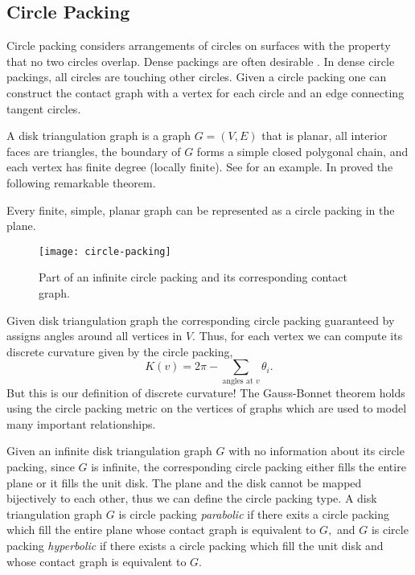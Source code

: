 \subsection{Circle Packing}
\label{sec:circle-packing}


Circle packing considers arrangements of circles on surfaces
with the property that no two circles overlap. 
Dense packings are often desirable \cite{chang_simple_2010}.
In dense circle packings, all circles are touching other circles.
Given a circle packing one can construct the contact graph with a vertex for each
circle and an edge connecting tangent circles.

A disk triangulation graph is a graph $G=(V,E)$ that is planar, all interior faces
are triangles, the boundary of $G$ forms a simple closed polygonal chain, and each
vertex has finite degree (locally finite).  See  for an example.
In  proved the following remarkable theorem.

\begin{theorem}\label{thm:kat}
Every finite, simple, planar graph can be represented as a circle packing in the plane.
\end{theorem}

\begin{figure}[htb]
        \centering
        \texttt{[image: circle-packing]}
		\caption{Part of an infinite circle packing and its corresponding contact graph.
		\label{fig:circle-packing}}
\end{figure}


Given disk triangulation graph the corresponding circle packing guaranteed
by  assigns angles around all vertices in $V$.
Thus, for each vertex we can compute its discrete curvature given by
the circle packing,
$$K(v)=2\pi -\sum_{\text{angles at } v}\theta_i.$$
But this is our definition of discrete curvature!
The Gauss-Bonnet theorem holds using the circle packing metric on the vertices
of graphs which are used to model many important relationships.






Given an infinite disk triangulation graph $G$ with no information about
its circle packing, since $G$ is infinite, the corresponding circle packing either fills
the entire plane or it fills the unit disk.
The plane and the disk cannot be mapped bijectively to each other, thus
we can define the circle packing type. A disk triangulation graph $G$ is circle packing
 \emph{parabolic} if there exits a circle packing which fill the entire plane 
 whose contact graph is equivalent to $G,$ and $G$ is circle packing \emph{hyperbolic}
 if there exists a circle packing which fill the unit disk and whose contact graph
 is equivalent to $G$.

